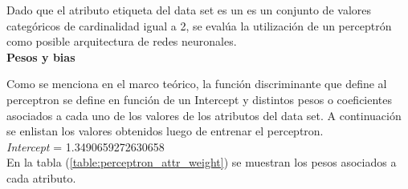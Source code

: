 \documentclass[osajnl,twocolumn,showpacs,superscriptaddress,10pt,floatfix]{revtex4-1} %
\begin{document}
Dado que el atributo etiqueta del data set es un es un conjunto de valores categóricos de cardinalidad igual a 2, se evalúa la utilización de un perceptrón como posible arquitectura de redes neuronales. \\

\textbf{Pesos y bias}

Como se menciona en el marco teórico, la función discriminante que define al perceptron se define en función de un Intercept y distintos pesos o coeficientes asociados a cada uno de los valores de los atributos del data set. A continuación se enlistan los valores obtenidos luego de entrenar el perceptron. \\

\textit{Intercept} = 1.3490659272630658 \\

En la tabla (\ref{table:perceptron_attr_weight}) se muestran los pesos asociados a cada atributo. \\
\end{document}
